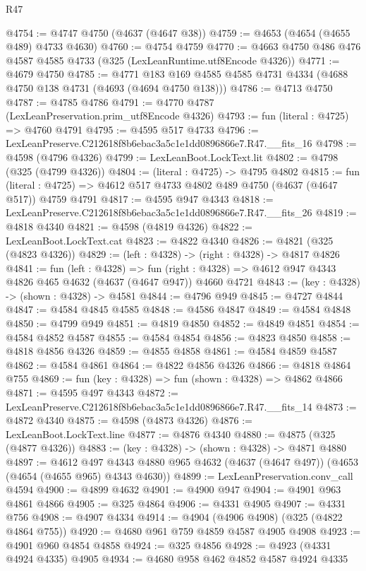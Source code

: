\begin{lexlean}{R47}
\begin{coremodule}
@4754 := @4747 @4750 (@4637 (@4647 @38))
@4759 := @4653 (@4654 (@4655 @489) @4733 @4630)
@4760 := @4754 @4759
@4770 := @4663 @4750 @486 @476 @4587 @4585 @4733 (@325 (LexLeanRuntime.utf8Encode @4326))
@4771 := @4679 @4750
@4785 := @4771 @183 @169 @4585 @4585 @4731 @4334 (@4688 @4750 @138 @4731 (@4693 (@4694 @4750 @138)))
@4786 := @4713 @4750
@4787 := @4785 @4786
@4791 := @4770 @4787 (LexLeanPreservation.prim_utf8Encode @4326)
@4793 := fun (literal : @4725) => @4760 @4791
@4795 := @4595 @517 @4733
@4796 := LexLeanPreserve.C212618f8b6ebac3a5c1e1dd0896866e7.R47.__fits_16
@4798 := @4598 (@4796 @4326)
@4799 := LexLeanBoot.LockText.lit
@4802 := @4798 (@325 (@4799 @4326))
@4804 := (literal : @4725) -> @4795 @4802
@4815 := fun (literal : @4725) => @4612 @517 @4733 @4802 @489 @4750 (@4637 (@4647 @517)) @4759 @4791
@4817 := @4595 @947 @4343
@4818 := LexLeanPreserve.C212618f8b6ebac3a5c1e1dd0896866e7.R47.__fits_26
@4819 := @4818 @4340
@4821 := @4598 (@4819 @4326)
@4822 := LexLeanBoot.LockText.cat
@4823 := @4822 @4340
@4826 := @4821 (@325 (@4823 @4326))
@4829 := (left : @4328) -> (right : @4328) -> @4817 @4826
@4841 := fun (left : @4328) =>
  fun (right : @4328) => @4612 @947 @4343 @4826 @465 @4632 (@4637 (@4647 @947)) @4660 @4721
@4843 := (key : @4328) -> (shown : @4328) -> @4581
@4844 := @4796 @949
@4845 := @4727 @4844
@4847 := @4584 @4845 @4585
@4848 := @4586 @4847
@4849 := @4584 @4848
@4850 := @4799 @949
@4851 := @4819 @4850
@4852 := @4849 @4851
@4854 := @4584 @4852 @4587
@4855 := @4584 @4854
@4856 := @4823 @4850
@4858 := @4818 @4856 @4326
@4859 := @4855 @4858
@4861 := @4584 @4859 @4587
@4862 := @4584 @4861
@4864 := @4822 @4856 @4326
@4866 := @4818 @4864 @755
@4869 := fun (key : @4328) => fun (shown : @4328) => @4862 @4866
@4871 := @4595 @497 @4343
@4872 := LexLeanPreserve.C212618f8b6ebac3a5c1e1dd0896866e7.R47.__fits_14
@4873 := @4872 @4340
@4875 := @4598 (@4873 @4326)
@4876 := LexLeanBoot.LockText.line
@4877 := @4876 @4340
@4880 := @4875 (@325 (@4877 @4326))
@4883 := (key : @4328) -> (shown : @4328) -> @4871 @4880
@4897 := @4612
    @497
    @4343
    @4880
    @965
    @4632
    (@4637 (@4647 @497))
    (@4653 (@4654 (@4655 @965) @4343 @4630))
@4899 := LexLeanPreservation.conv_call @4594
@4900 := @4899 @4632
@4901 := @4900 @947
@4904 := @4901 @963 @4861 @4866
@4905 := @325 @4864
@4906 := @4331 @4905
@4907 := @4331 @756
@4908 := @4907 @4334
@4914 := @4904 (@4906 @4908) (@325 (@4822 @4864 @755))
@4920 := @4680 @961 @759 @4859 @4587 @4905 @4908
@4923 := @4901 @960 @4854 @4858
@4924 := @325 @4856
@4928 := @4923 (@4331 @4924 @4335) @4905
@4934 := @4680 @958 @462 @4852 @4587 @4924 @4335

\end{coremodule}
\end{lexlean}
